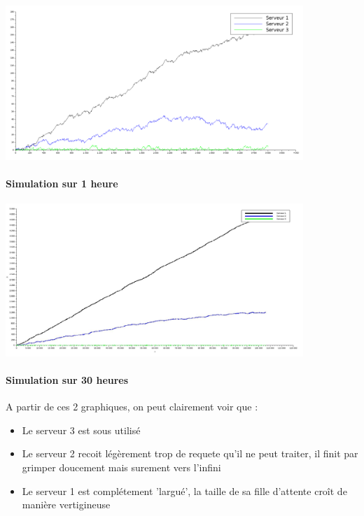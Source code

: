\documentclass{article}
\begin{document}

\begin{center}
	\includegraphics[width=425px]{img/circul1h.png}
\end{center}
\paragraph{Simulation sur 1 heure}

\begin{center}
	\includegraphics[width=425px]{img/circul30h.jpg}
\end{center}
\paragraph{Simulation sur 30 heures}
A partir de ces 2 graphiques, on peut clairement voir que :
\begin{itemize}
	\item Le serveur 3 est sous utilisé
	\item Le serveur 2 recoit légèrement trop de requete qu'il ne peut traiter, il finit par grimper doucement mais surement vers l'infini
	\item Le serveur 1 est complétement 'largué', la taille de sa fille d'attente croît de manière vertigineuse
\end{itemize}
\end{document}
